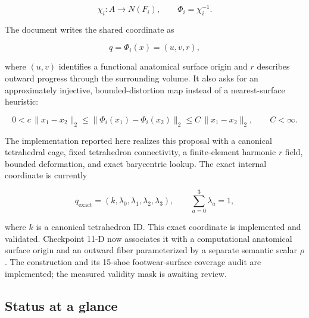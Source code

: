\documentclass[11pt]{article}
\begin{document}
\begin{equation}
  \chi_i:A\rightarrow N(F_i),
  \qquad
  \Phi_i=\chi_i^{-1}.
  \label{eq:document-map}
\end{equation}

The document writes the shared coordinate as

\begin{equation}
  q=\Phi_i(x)=(u,v,r),
\end{equation}

where $(u,v)$ identifies a functional anatomical surface origin and $r$ describes
outward progress through the surrounding volume. It also asks for an approximately
injective, bounded-distortion map instead of a nearest-surface heuristic:

\begin{equation}
  0<c\,\|x_1-x_2\|_2
  \leq \|\Phi_i(x_1)-\Phi_i(x_2)\|_2
  \leq C\,\|x_1-x_2\|_2,
  \qquad C<\infty.
  \label{eq:document-bounded-distortion}
\end{equation}

The implementation reported here realizes this proposal with a canonical tetrahedral
cage, fixed tetrahedron connectivity, a finite-element harmonic $r$ field, bounded
deformation, and exact barycentric lookup. The exact internal coordinate is currently

\begin{equation}
  q_{\mathrm{exact}}=(k,\lambda_0,\lambda_1,\lambda_2,\lambda_3),
  \qquad \sum_{a=0}^{3}\lambda_a=1,
  \label{eq:exact-coordinate}
\end{equation}

where $k$ is a canonical tetrahedron ID. This exact coordinate is implemented and
validated. Checkpoint 11-D now associates it with a computational anatomical surface
origin and an outward fiber parameterized by a separate semantic scalar $\rho$. The
construction and its 15-shoe footwear-surface coverage audit are implemented; the measured
validity mask is awaiting review.

\subsection{Status at a glance}
\end{document}
